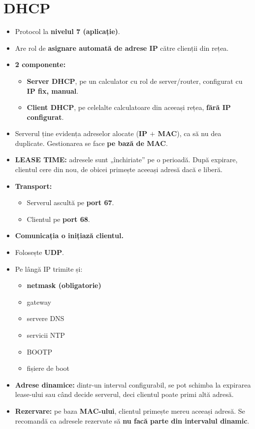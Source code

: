 \documentclass[11pt,a4paper]{article}
\begin{document}

\section{DHCP}
\begin{itemize}
  \item Protocol la \textbf{nivelul 7 (aplicație)}.
  \item Are rol de \textbf{asignare automată de adrese IP} către clienții din rețea.
  \item \textbf{2 componente:}
  \begin{itemize}
    \item \textbf{Server DHCP}, pe un calculator cu rol de server/router, configurat cu \textbf{IP fix, manual}.
    \item \textbf{Client DHCP}, pe celelalte calculatoare din aceeași rețea, \textbf{fără IP configurat}.
  \end{itemize}
  \item Serverul ține evidența adreselor alocate (\textbf{IP $+$ MAC}), ca să nu dea duplicate. Gestionarea se face \textbf{pe bază de MAC}.
  \item \textbf{LEASE TIME:} adresele sunt „închiriate” pe o perioadă. După expirare, clientul cere din nou, de obicei primește aceeași adresă dacă e liberă.
  \item \textbf{Transport:}
  \begin{itemize}
    \item Serverul ascultă pe \textbf{port 67}.
    \item Clientul pe \textbf{port 68}.
  \end{itemize}
  \item \textbf{Comunicația o inițiază clientul.}
  \item Folosește \textbf{UDP}.
  \item Pe lângă IP trimite și:
  \begin{itemize}
    \item \textbf{netmask (obligatorie)}
    \item gateway
    \item servere DNS
    \item servicii NTP
    \item BOOTP
    \item fișiere de boot
  \end{itemize}
  \item \textbf{Adrese dinamice:} dintr-un interval configurabil, se pot schimba la expirarea lease-ului sau când decide serverul, deci clientul poate primi altă adresă.
  \item \textbf{Rezervare:} pe baza \textbf{MAC-ului}, clientul primește mereu aceeași adresă. Se recomandă ca adresele rezervate să \textbf{nu facă parte din intervalul dinamic}.
\end{itemize}
\end{document}
